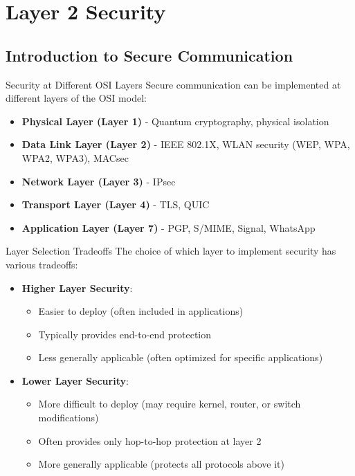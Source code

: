 \section{Layer 2 Security}

\subsection{Introduction to Secure Communication}

\begin{concept}{Security at Different OSI Layers}
Secure communication can be implemented at different layers of the OSI model:
\begin{itemize}
    \item \textbf{Physical Layer (Layer 1)} - Quantum cryptography, physical isolation
    \item \textbf{Data Link Layer (Layer 2)} - IEEE 802.1X, WLAN security (WEP, WPA, WPA2, WPA3), MACsec
    \item \textbf{Network Layer (Layer 3)} - IPsec
    \item \textbf{Transport Layer (Layer 4)} - TLS, QUIC
    \item \textbf{Application Layer (Layer 7)} - PGP, S/MIME, Signal, WhatsApp
\end{itemize}
\end{concept}

\begin{theorem}{Layer Selection Tradeoffs}
The choice of which layer to implement security has various tradeoffs:
\begin{itemize}
    \item \textbf{Higher Layer Security}:
    \begin{itemize}
        \item Easier to deploy (often included in applications)
        \item Typically provides end-to-end protection
        \item Less generally applicable (often optimized for specific applications)
    \end{itemize}
    \item \textbf{Lower Layer Security}:
    \begin{itemize}
        \item More difficult to deploy (may require kernel, router, or switch modifications)
        \item Often provides only hop-to-hop protection at layer 2
        \item More generally applicable (protects all protocols above it)
    \end{itemize}
\end{itemize}
\end{theorem}


